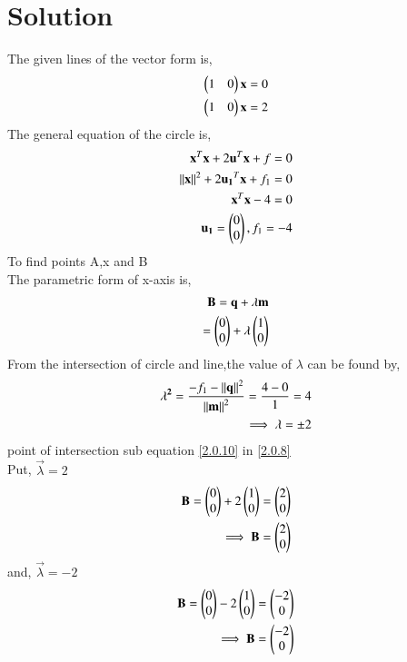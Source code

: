 \documentclass[journal,12pt,twocolumn]{IEEEtran}
\begin{document}
\section{Solution}
The given lines of the vector form is,
\begin{align}
\begin{pmatrix}1 & 0\end{pmatrix}\mathbf{x}=0
\\
\begin{pmatrix}1 & 0\end{pmatrix}\mathbf{x}=2
\end{align}
The general equation of the circle is,
\begin{align}
\mathbf{x}^T\mathbf{x} + 2\mathbf{u}^T\mathbf{x} + f = 0  
\\
\left\lVert\mathbf{x}\right\rVert^2 + 2\mathbf{u_1}^T\mathbf{x} + f_1 = 0
\\
\mathbf{x}^T\mathbf{x}- 4 = 0
\\
\mathbf{u_1} = \begin{pmatrix}0 \\ 0\end{pmatrix},f_1=-4
\end{align}
To find points A,x and B
\\
The parametric form of x-axis is,
\begin{align}
\mathbf{B}=\mathbf{q}+\lambda \mathbf{m}\\
=\begin{pmatrix}0\\0\end{pmatrix}+\lambda \begin{pmatrix}1\\0\end{pmatrix} \label{2.0.8}
\end{align}
From the intersection of circle and line,the value of $\lambda$ can be found by,
\begin{align}
\mathbf{\lambda^2}=\frac{{{-f_1}-\left\lVert\mathbf{q}\right\rVert^2 }}{{\left\lVert\mathbf{m}\right\rVert^2}}=\frac{{{4}-{0} }}{{ {1 }}}=4
\\
\implies \mathbf{\lambda}=\pm{2} \label{2.0.10}
\end{align}
 point of intersection sub equation \eqref{2.0.10} in \eqref{2.0.8}
\\
Put, $\vec{\lambda}= 2$
\begin{align}
\mathbf{B}=\begin{pmatrix}0\\0\end{pmatrix}+2\begin{pmatrix}1\\ 0\end{pmatrix}=\begin{pmatrix}2 \\ 0\end{pmatrix}
\\ 
\implies\mathbf{B}=\begin{pmatrix}2\\0\end{pmatrix}
\end{align}
and, $\vec{\lambda}=-2$
\begin{align}
\mathbf{B}=\begin{pmatrix}0 \\0\end{pmatrix}-2\begin{pmatrix}1\\0\end{pmatrix}=\begin{pmatrix}-2 \\ 0\end{pmatrix}
\\ 
\implies\mathbf{B}=\begin{pmatrix}-2\\ 0\end{pmatrix}
\end{align}
\end{document}
